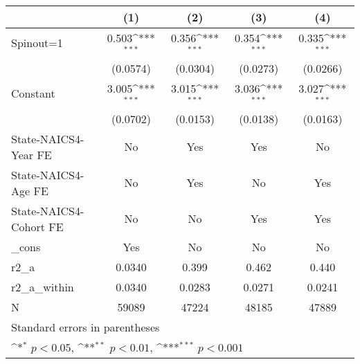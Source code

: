 {
\def\sym#1{\ifmmode^{#1}\else\(^{#1}\)\fi}
\begin{tabular}{l*{4}{c}}
\hline\hline
                    &\multicolumn{1}{c}{(1)}         &\multicolumn{1}{c}{(2)}         &\multicolumn{1}{c}{(3)}         &\multicolumn{1}{c}{(4)}         \\
\hline
Spinout=1           &       0.503\sym{***}&       0.356\sym{***}&       0.354\sym{***}&       0.335\sym{***}\\
                    &    (0.0574)         &    (0.0304)         &    (0.0273)         &    (0.0266)         \\
[1em]
Constant            &       3.005\sym{***}&       3.015\sym{***}&       3.036\sym{***}&       3.027\sym{***}\\
                    &    (0.0702)         &    (0.0153)         &    (0.0138)         &    (0.0163)         \\
[1em]
State-NAICS4-Year FE&          No         &         Yes         &         Yes         &          No         \\
[1em]
State-NAICS4-Age FE &          No         &         Yes         &          No         &         Yes         \\
[1em]
State-NAICS4-Cohort FE&          No         &          No         &         Yes         &         Yes         \\
[1em]
\_cons              &         Yes         &          No         &          No         &          No         \\
\hline
r2\_a                &      0.0340         &       0.399         &       0.462         &       0.440         \\
r2\_a\_within         &      0.0340         &      0.0283         &      0.0271         &      0.0241         \\
N                   &       59089         &       47224         &       48185         &       47889         \\
\hline\hline
\multicolumn{5}{l}{\footnotesize Standard errors in parentheses}\\
\multicolumn{5}{l}{\footnotesize \sym{*} \(p<0.05\), \sym{**} \(p<0.01\), \sym{***} \(p<0.001\)}\\
\end{tabular}
}
